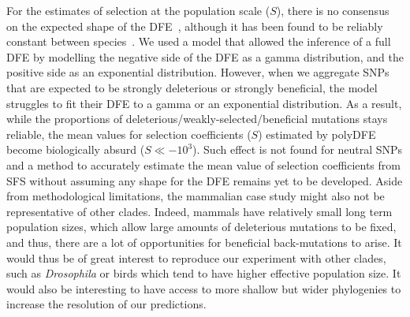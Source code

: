 \documentclass{article}
\newcommand{\Spop}{S}
\begin{document}
    For the estimates of selection at the population scale ($\Spop$), there is no consensus on the expected shape of the DFE~\cite{welch_divergence_2008, bataillon_effects_2014}, although it has been found to be reliably constant between species~\cite{castellano_comparison_2019}.
    We used a model that allowed the inference of a full DFE by modelling the negative side of the DFE as a gamma distribution, and the positive side as an exponential distribution.
    However, when we aggregate SNPs that are expected to be strongly deleterious or strongly beneficial, the model struggles to fit their DFE to a gamma or an exponential distribution.
    As a result, while the proportions of deleterious/weakly-selected/beneficial mutations stays reliable, the mean values for selection coefficients ($\Spop$) estimated by polyDFE become biologically absurd ($\Spop \ll -10^3$).
    Such effect is not found for neutral SNPs and a method to accurately estimate the mean value of selection coefficients from SFS without assuming any shape for the DFE remains yet to be developed.
    Aside from methodological limitations, the mammalian case study might also not be representative of other clades.
    Indeed, mammals have relatively small long term population sizes, which allow large amounts of deleterious mutations to be fixed, and thus, there are a lot of opportunities for beneficial back-mutations to arise.
    It would thus be of great interest to reproduce our experiment with other clades, such as \textit{Drosophila} or birds which tend to have higher effective population size.
    It would also be interesting to have access to more shallow but wider phylogenies to increase the resolution of our predictions.
\end{document}
